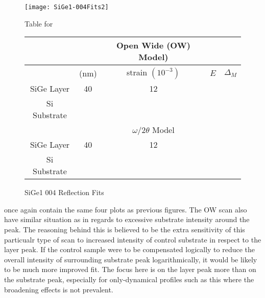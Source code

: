 \begin{figure}[hc]%
\caption{SiGe1 004 Reflection Fits}
\label{SiGe1-004}
\begin{minipage}{0.85\linewidth}
\texttt{[image: SiGe1-004Fits2]}
\end{minipage}
\begin{minipage}{\linewidth}
\centering
\vspace{10pt}
Table for \\
\vspace{5pt}
\begin{tabular}{c|cccc}
			& 	&Open Wide (OW) Model)	 \\
\hline
			&	(nm)	&	strain	 $(10^{-3})$&	$E$&  $\Delta_M$\\
\hline
SiGe Layer		&  	40	&      12	 &\textendash & \textendash\ 	\\
Si Substrate		&	\textemdash & \textemdash&\textemdash\ &\textemdash	\\
\hline
			& &$\omega/2\theta$ Model \\
\hline
SiGe Layer		&	40	& 12	&\textendash	&\textendash\ 	\\
Si Substrate		&	\textemdash & \textemdash&\textemdash\ &\textemdash
\end{tabular}
\end{minipage}
\end{figure}

 once again contain the same four plots as previous figures.  The OW scan also have similar situation as  in regards to excessive substrate intensity around the peak.  The reasoning behind this is believed to be the extra sensitivity of this particualr type of scan to increased intensity of control substrate in respect to the layer peak.  If the control sample were to be compensated logically to reduce the overall intensity of surrounding substrate peak logarithmically, it would be likely to be much more improved fit.  The focus here is on the layer peak more than on the substrate peak, especially for only-dynamical profiles such as this where the broadening effects is not prevalent.  

